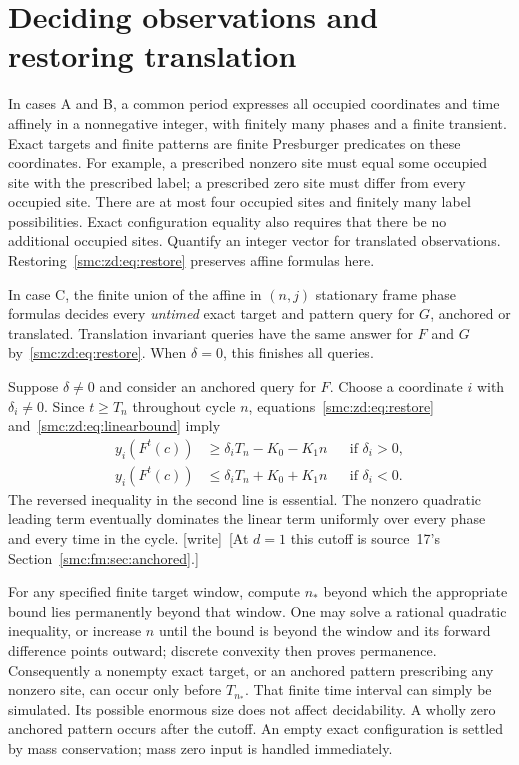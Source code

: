 \documentclass[11pt,letterpaper]{article}
\numberwithin{equation}{section}
\theoremstyle{definition}
\theoremstyle{remark}
\newcommand{\wtag}{\textup{[write]}}
\begin{document}
\section{Deciding observations and restoring translation}\label{smc:zd:sec:observations}
In cases A and B, a common period expresses all occupied coordinates and time affinely in a nonnegative integer, with finitely many phases and a finite transient. Exact targets and finite patterns are finite Presburger predicates on these coordinates. For example, a prescribed nonzero site must equal some occupied site with the prescribed label; a prescribed zero site must differ from every occupied site. There are at most four occupied sites and finitely many label possibilities. Exact configuration equality also requires that there be no additional occupied sites. Quantify an integer vector for translated observations. Restoring~\eqref{smc:zd:eq:restore} preserves affine formulas here.

In case C, the finite union of the affine in $(n,j)$ stationary frame phase formulas decides every \emph{untimed} exact target and pattern query for $G$, anchored or translated. Translation invariant queries have the same answer for $F$ and $G$ by~\eqref{smc:zd:eq:restore}. When $\delta=0$, this finishes all queries.

Suppose $\delta\ne0$ and consider an anchored query for $F$. Choose a coordinate $i$ with $\delta_i\ne0$. Since $t\ge T_n$ throughout cycle $n$, equations~\eqref{smc:zd:eq:restore} and~\eqref{smc:zd:eq:linearbound} imply
\begin{align}
 y_i(F^t(c))&\ge\delta_iT_n-K_0-K_1n&&\text{if }\delta_i>0,\label{smc:zd:eq:cutpos}\\
 y_i(F^t(c))&\le\delta_iT_n+K_0+K_1n&&\text{if }\delta_i<0.\label{smc:zd:eq:cutneg}
\end{align}
The reversed inequality in the second line is essential. The nonzero quadratic leading term eventually dominates the linear term uniformly over every phase and every time in the cycle.
\wtag\ [At $d=1$ this cutoff is source~17's Section~\ref{smc:fm:sec:anchored}.]

For any specified finite target window, compute $n_*$ beyond which the appropriate bound lies permanently beyond that window. One may solve a rational quadratic inequality, or increase $n$ until the bound is beyond the window and its forward difference points outward; discrete convexity then proves permanence. Consequently a nonempty exact target, or an anchored pattern prescribing any nonzero site, can occur only before $T_{n_*}$. That finite time interval can simply be simulated. Its possible enormous size does not affect decidability. A wholly zero anchored pattern occurs after the cutoff. An empty exact configuration is settled by mass conservation; mass zero input is handled immediately.
\end{document}
